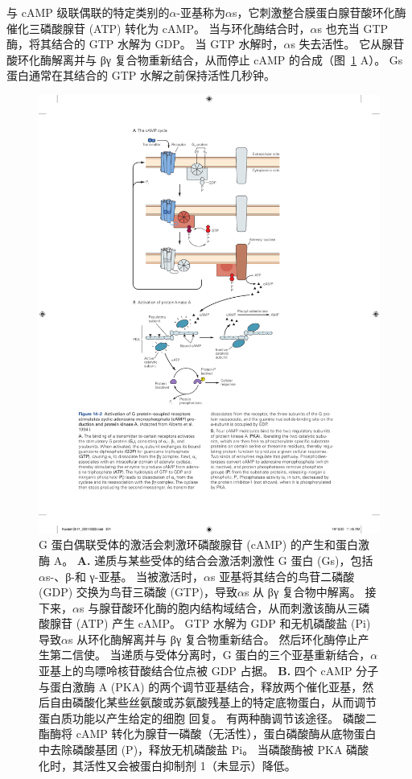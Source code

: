 与 cAMP 级联偶联的特定类别的$\alpha$-亚基称为$\alpha$s，它刺激整合膜蛋白腺苷酸环化酶催化三磷酸腺苷 (ATP) 转化为 cAMP。
当与环化酶结合时，$\alpha$s 也充当 GTP 酶，将其结合的 GTP 水解为 GDP。
当 GTP 水解时，$\alpha$s 失去活性。
它从腺苷酸环化酶解离并与 βγ 复合物重新结合，从而停止 cAMP 的合成（图~\ref{fig:14_2} A）。
Gs 蛋白通常在其结合的 GTP 水解之前保持活性几秒钟。


\begin{figure}[htbp]
	\centering
	\includegraphics[width=0.65\linewidth]{chap14/fig_14_2}
	\caption{G 蛋白偶联受体的激活会刺激环磷酸腺苷 (cAMP) 的产生和蛋白激酶 A\cite{alberts2017molecular}。
		\textbf{A.} 递质与某些受体的结合会激活刺激性 G 蛋白 (Gs)，包括 $\alpha$s-、β-和 γ-亚基。
		当被激活时，$\alpha$s 亚基将其结合的鸟苷二磷酸 (GDP) 交换为鸟苷三磷酸 (GTP)，导致$\alpha$s 从 βγ 复合物中解离。
		接下来，$\alpha$s 与腺苷酸环化酶的胞内结构域结合，从而刺激该酶从三磷酸腺苷 (ATP) 产生 cAMP。
		GTP 水解为 GDP 和无机磷酸盐 (Pi) 导致$\alpha$s 从环化酶解离并与 βγ 复合物重新结合。
		然后环化酶停止产生第二信使。
		当递质与受体分离时，G 蛋白的三个亚基重新结合，$\alpha$亚基上的鸟嘌呤核苷酸结合位点被 GDP 占据。
		\textbf{B.} 四个 cAMP 分子与蛋白激酶 A (PKA) 的两个调节亚基结合，释放两个催化亚基，然后自由磷酸化某些丝氨酸或苏氨酸残基上的特定底物蛋白，从而调节蛋白质功能以产生给定的细胞 回复。
		有两种酶调节该途径。
		磷酸二酯酶将 cAMP 转化为腺苷一磷酸（无活性），蛋白磷酸酶从底物蛋白中去除磷酸基团 (P)，释放无机磷酸盐 Pi。
		当磷酸酶被 PKA 磷酸化时，其活性又会被蛋白抑制剂 1（未显示）降低。}
	\label{fig:14_2}
\end{figure}


